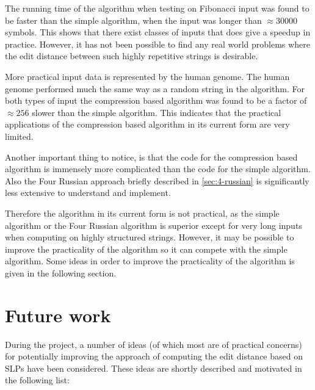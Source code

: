 \documentclass[twoside,11pt,openright]{report}
\begin{document}
The running time of the algorithm when testing on Fibonacci input was found to be faster than the simple algorithm, when the input was longer than $\approx 30000$ symbols. This shows that there exist classes of inputs that does give a speedup in practice. However, it has not been possible to find any real world problems where the edit distance between such highly repetitive strings is desirable.

More practical input data is represented by the human genome. The human genome performed much the same way as a random string in the algorithm. For both types of input the compression based algorithm was found to be a factor of $\approx 256$ slower than the simple algorithm. This indicates that the practical applications of the compression based algorithm in its current form are very limited.

Another important thing to notice, is that the code for the compression based algorithm is immensely more complicated than the code for the simple algorithm. Also the Four Russian approach briefly described in \cref{sec:4-russian} is significantly less extensive to understand and implement.

Therefore the algorithm in its current form is not practical, as the simple algorithm or the Four Russian algorithm is superior except for very long inputs when computing on highly structured strings. However, it may be possible to improve the practicality of the algorithm so it can compete with the simple algorithm. Some ideas in order to improve the practicality of the algorithm is given in the following section.

\section{Future work}
\label{sec:conclusion:future-work}
During the project, a number of ideas (of which most are of practical concerns) for potentially improving the approach of computing the edit distance based on SLPs have been considered. These ideas are shortly described and motivated in the following list:
\enlargethispage{20\baselineskip}
\end{document}
